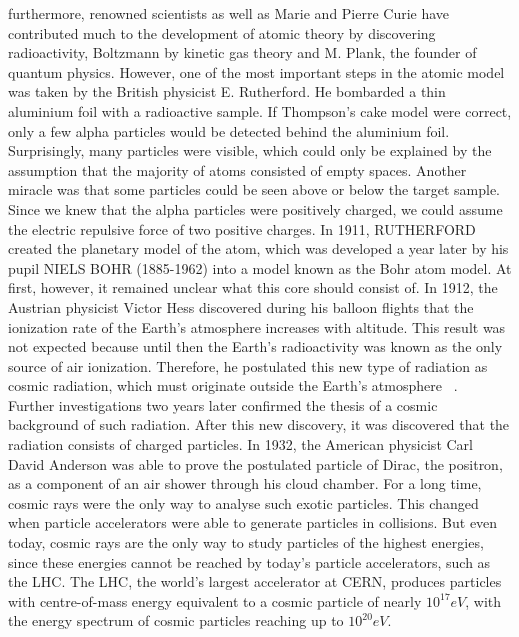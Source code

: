 furthermore, renowned scientists as well as Marie and Pierre Curie have contributed much to the development of atomic theory by discovering radioactivity, Boltzmann by kinetic gas theory and M. Plank, the founder of quantum physics.
However, one of the most important steps in the atomic model was taken by the British physicist E. Rutherford. He bombarded a thin aluminium foil with a radioactive sample. If Thompson's cake model were correct, only a few alpha particles would be detected behind the aluminium foil. Surprisingly, many particles were visible, which could only be explained by the assumption that the majority of atoms consisted of empty spaces. Another miracle was that some particles could be seen above or below the target sample. Since we knew that the alpha particles were positively charged, we could assume the electric repulsive force of two positive charges. In 1911, RUTHERFORD created the planetary model of the atom, which was developed a year later by his pupil NIELS BOHR (1885-1962) into a model known as the Bohr atom model.
At first, however, it remained unclear what this core should consist of. \cite{haken2013atom, demtroder2005experimentalphysik}   
In 1912, the Austrian physicist Victor Hess discovered during his balloon flights that the ionization rate of the Earth's atmosphere increases with altitude. This result was not expected because until then the Earth's radioactivity was known as the only source of air ionization. Therefore, he postulated this new type of radiation as cosmic radiation, which must originate outside the Earth's atmosphere ~\cite{Ender}.\\
Further investigations two years later confirmed the thesis of a cosmic background of such radiation. After this new discovery, it was discovered that the radiation consists of charged particles. In 1932, the American physicist Carl David Anderson was able to prove the postulated particle of Dirac, the positron, as a component of an air shower through his cloud chamber. For a long time, cosmic rays were the only way to analyse such exotic particles.\cite{Bluemer:2009zf}
This changed when particle accelerators were able to generate particles in collisions. But even today, cosmic rays are the only way to study particles of the highest energies, since these energies cannot be reached by today's particle accelerators, such as the LHC. The LHC, the world's largest accelerator at CERN, produces particles with centre-of-mass energy equivalent to a cosmic particle of nearly $10^{17} eV $, with the energy spectrum of cosmic particles reaching up to $10^{20} eV $.
